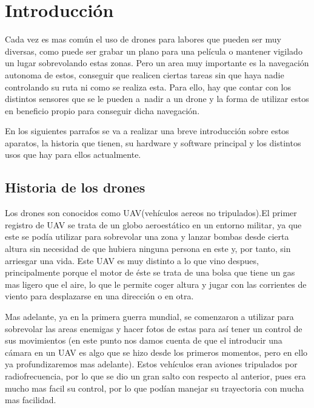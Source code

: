 \chapter{Introducci\'on}\label{cap.introduccion}
\hspace{1 cm}Cada vez es mas com\'un el uso de drones para labores que pueden ser muy diversas, como puede ser grabar un plano para una pel\'icula o mantener vigilado un lugar sobrevolando estas zonas. Pero un area muy importante es la navegaci\'on autonoma de estos, conseguir que realicen ciertas tareas sin que haya nadie controlando su ruta ni como se realiza esta. Para ello, hay que contar con los distintos sensores que se le pueden a~nadir a un drone y la forma de utilizar estos en beneficio propio para conseguir dicha navegaci\'on.

\hspace{1cm} En los siguientes parrafos se va a realizar una breve introducci\'on sobre estos aparatos, la historia que tienen, su hardware y software principal y los distintos usos que hay para ellos actualmente.

\section{Historia de los drones}

\hspace{1cm} Los drones son conocidos como UAV(veh\'iculos aereos no tripulados).El primer registro de UAV se trata de un globo aeroest\'atico en un entorno militar, ya que este se pod\'ia utilizar para sobrevolar una zona y lanzar bombas desde cierta altura sin necesidad de que hubiera ninguna persona en este y, por tanto, sin arriesgar una vida. Este UAV es muy distinto a lo que vino despues, principalmente porque el motor de \'este se trata de una bolsa que tiene un gas mas ligero que el aire, lo que le permite coger altura y jugar con las corrientes de viento para desplazarse en una direcci\'on o en otra.

\hspace{1 cm} Mas adelante, ya en la primera guerra mundial, se comenzaron a utilizar para sobrevolar las areas enemigas y hacer fotos de estas para as\'i tener un control de sus movimientos (en este punto nos damos cuenta de que el introducir una c\'amara en un UAV es algo que se hizo desde los primeros momentos, pero en ello ya profundizaremos mas adelante). Estos veh\'iculos eran aviones tripulados por radiofrecuencia, por lo que se dio un gran salto con respecto al anterior, pues era mucho mas facil su control, por lo que pod\'ian manejar su trayectoria con mucha mas facilidad. 

